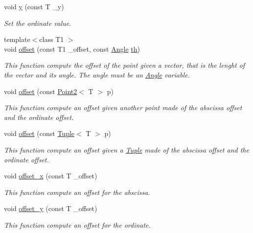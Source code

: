 \begin{DoxyCompactItemize}
void \mbox{\hyperlink{class_point2_a967025762c1b4dede5eb822f5c29522e}{y}} (const T \+\_\+y)
\begin{DoxyCompactList}\small\item\em Set the ordinate value. \end{DoxyCompactList}\item 
{\footnotesize template$<$class T1 $>$ }\\void \mbox{\hyperlink{class_point2_ae55da7a4bd7fe7491ebc0134a39bb791}{offset}} (const T1 \+\_\+offset, const \mbox{\hyperlink{class_angle}{Angle}} \mbox{\hyperlink{class_point2_a4557e6d2741e1950ddfc6f854cd4a1fa}{th}})
\begin{DoxyCompactList}\small\item\em This function compute the offset of the point given a vector, that is the lenght of the vector and its angle. The angle must be an {\ttfamily \mbox{\hyperlink{class_angle}{Angle}}} variable. \end{DoxyCompactList}\item 
void \mbox{\hyperlink{class_point2_ac171989ec252c36ce6253916269186f8}{offset}} (const \mbox{\hyperlink{class_point2}{Point2}}$<$ T $>$ p)
\begin{DoxyCompactList}\small\item\em This function compute an offset given another point made of the abscissa offset and the ordinate offset. \end{DoxyCompactList}\item 
void \mbox{\hyperlink{class_point2_aaa05b71e25db64c365fe2377d4f3f812}{offset}} (const \mbox{\hyperlink{class_tuple}{Tuple}}$<$ T $>$ p)
\begin{DoxyCompactList}\small\item\em This function compute an offset given a {\ttfamily \mbox{\hyperlink{class_tuple}{Tuple}}} made of the abscissa offset and the ordinate offset. \end{DoxyCompactList}\item 
void \mbox{\hyperlink{class_point2_a24d1c6e9487f0baa48543b0fa1c87906}{offset\+\_\+x}} (const T \+\_\+offset)
\begin{DoxyCompactList}\small\item\em This function compute an offset for the abscissa. \end{DoxyCompactList}\item 
void \mbox{\hyperlink{class_point2_a847590c808b59b824ac3c0044544ab6b}{offset\+\_\+y}} (const T \+\_\+offset)
\begin{DoxyCompactList}\small\item\em This function compute an offset for the ordinate. \end{DoxyCompactList}\item 

\end{DoxyCompactItemize}
